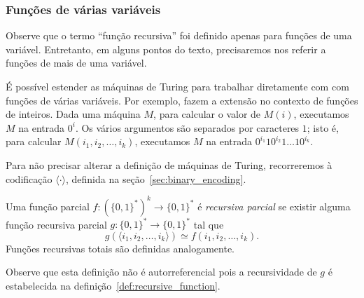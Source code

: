 
\subsubsection{Funções de várias variáveis}

Observe que o termo ``função recursiva''
foi definido apenas para funções de uma variável.
Entretanto,
em alguns pontos do texto,
precisaremos nos referir a funções de mais de uma variável.

É possível estender as máquinas de Turing
para trabalhar diretamente com com funções de várias variáveis.
Por exemplo, 
fazem a extensão no contexto de funções de inteiros.
Dada uma máquina $M$,
para calcular o valor de $M(i)$,
executamos $M$ na entrada $0^i$.
Os vários argumentos são separados por caracteres $1$;
isto é, para calcular $M(i_1, i_2, \dots, i_k)$,
executamos $M$ na entrada $0^{i_1} 1 0^{i_2} 1 \dots 1 0^{i_k}$.

Para não precisar alterar a definição de máquinas de Turing,
recorreremos à codificação $\langle \cdot \rangle$,
definida na seção~\ref{sec:binary_encoding}.

\begin{definition}
    \label{def:multi_valued_recursive_function}
    Uma função parcial $f: (\{0, 1\}^*)^k \to \{0, 1\}^*$ é \emph{recursiva parcial}
    se existir alguma função recursiva parcial $g: \{0, 1\}^* \to \{0, 1\}^*$
    tal que
    \begin{equation*}
        g(\langle i_1, i_2, \dots, i_k \rangle) \simeq f(i_1, i_2, \dots, i_k).
    \end{equation*}
    Funções recursivas totais são definidas analogamente.
\end{definition}

Observe que esta definição não é autorreferencial
pois a recursividade de $g$ é estabelecida na definição~\ref{def:recursive_function}.

